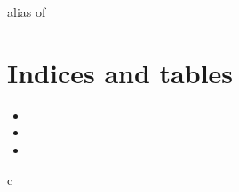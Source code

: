 \documentclass[letterpaper,10pt,english]{sphinxmanual}
\begin{document}

\begin{fulllineitems}
\label{\detokenize{code:cis_interface.dataio}}
alias of {\hyperref[\detokenize{code:cis_interface.dataio}]{}}

\end{fulllineitems}



\chapter{Indices and tables}
\label{\detokenize{index:indices-and-tables}}\begin{itemize}
\item {} 

\item {} 

\item {} 

\end{itemize}


\renewcommand{\indexname}{Python Module Index}
\begin{sphinxtheindex}
\def\bigletter#1{{\Large\sffamily#1}\nopagebreak\vspace{1mm}}
\bigletter{c}
\item {}
\end{sphinxtheindex}

\renewcommand{\indexname}{Index}
\printindex
\end{document}
